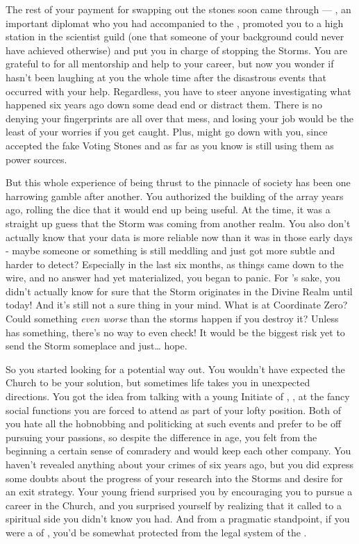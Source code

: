 \documentclass[char]{GL2020}
\begin{document}
The rest of your payment for swapping out the stones soon came through — \cDiplomat{\full}, an important \pTech{} diplomat who you had accompanied to the \pSchool{}, promoted you to a high station in the scientist guild (one that someone of your background could never have achieved otherwise) and put you in charge of stopping the Storms. You are grateful to \cDiplomat{} for all \cDiplomat{\their} mentorship and help to your career, but now you wonder if \cEvil{} hasn’t been laughing at you the whole time after the disastrous events that occurred with your help. Regardless, you have to steer anyone investigating what happened six years ago down some dead end or distract them. There is no denying your fingerprints are all over that mess, and losing your job would be the least of your worries if you get caught. Plus, \cChupInventor{} might go down with you, since \cChupInventor{\they} accepted the fake Voting Stones and as far as you know is still using them as power sources.

But this whole experience of being thrust to the pinnacle of society has been one harrowing gamble after another. You authorized the building of the array years ago, rolling the dice that it would end up being useful. At the time, it was a straight up guess that the Storm was coming from another realm. You also don’t actually know that your data is more reliable now than it was in those early days - maybe someone or something is still meddling and just got more subtle and harder to detect? Especially in the last six months, as things came down to the wire, and no answer had yet materialized, you began to panic. For \cTechGod{}’s sake, you didn’t actually know for sure that the Storm originates in the Divine Realm until today! And it’s still not a sure thing in your mind. What is at Coordinate Zero? Could something \emph{even worse} than the storms happen if you destroy it? Unless \cCurse{} has something, there’s no way to even check! It would be the biggest risk yet to send the Storm someplace and just\ldots{} hope.

So you started looking for a potential way out. You wouldn't have expected the Church to be your solution, but sometimes life takes you in unexpected directions. You got the idea from talking with a young Initiate of \cTechGod{}, \cScholarship{\full}, at the fancy social functions you are forced to attend as part of your lofty position. Both of you hate all the hobnobbing and politicking at such events and prefer to be off pursuing your passions, so despite the difference in age, you felt from the beginning a certain sense of comradery and would keep each other company. You haven't revealed anything about your crimes of six years ago, but you did express some doubts about the progress of your research into the Storms and desire for an exit strategy. Your young friend surprised you by encouraging you to pursue a career in the Church, and you surprised yourself by realizing that it called to a spiritual side you didn't know you had. And from a pragmatic standpoint, if you were a \cHeadScientist{\cleric} of \cTechGod{}, you'd be somewhat protected from the legal system of the \pTech{}. 
\end{document}
